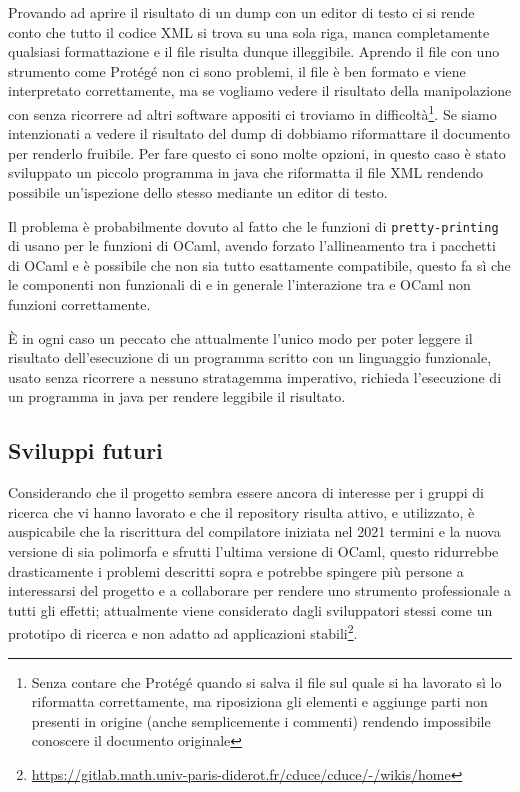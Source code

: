 Provando ad aprire il risultato di un dump con un editor di testo ci si rende conto che tutto il codice XML si trova su una sola riga, manca completamente qualsiasi formattazione e il file risulta dunque illeggibile. Aprendo il file con uno strumento come Protégé non ci sono problemi, il file è ben formato e viene interpretato correttamente, ma se vogliamo vedere il risultato della manipolazione con \cduce senza ricorrere ad altri software appositi ci troviamo in difficoltà\footnote{Senza contare che Protégé quando si salva il file sul quale si ha lavorato sì lo riformatta correttamente, ma riposiziona gli elementi e aggiunge parti non presenti in origine (anche semplicemente i commenti) rendendo impossibile conoscere il documento originale}. Se siamo intenzionati a vedere il risultato del dump di \cduce dobbiamo riformattare il documento per renderlo fruibile. Per fare questo ci sono molte opzioni, in questo caso è stato sviluppato un piccolo programma in java che riformatta il file XML rendendo possibile un'ispezione dello stesso mediante un editor di testo. 

Il problema è probabilmente dovuto al fatto che le funzioni di \verb|pretty-printing| di \cduce usano per le funzioni di OCaml, avendo forzato l'allineamento tra i pacchetti di OCaml e \cduce è possibile che non sia tutto esattamente compatibile, questo fa sì che le componenti non funzionali di \cduce e in generale l'interazione tra \cduce e OCaml non funzioni correttamente.

È in ogni caso un peccato che attualmente l'unico modo per poter leggere il risultato dell'esecuzione di un programma scritto con un linguaggio funzionale, usato senza ricorrere a nessuno stratagemma imperativo, richieda l'esecuzione di un programma in java per rendere leggibile il risultato.
\subsection{Sviluppi futuri}
Considerando che il progetto sembra essere ancora di interesse per i gruppi di ricerca che vi hanno lavorato e che il repository risulta attivo, e utilizzato, è auspicabile che la riscrittura del compilatore iniziata nel 2021 termini e la nuova versione di \cduce sia polimorfa e sfrutti l'ultima versione di OCaml, questo ridurrebbe drasticamente i problemi descritti sopra e potrebbe spingere più persone a interessarsi del progetto e a collaborare per rendere \cduce uno strumento professionale a tutti gli effetti; attualmente \cduce viene considerato dagli sviluppatori stessi come un prototipo di ricerca e non adatto ad applicazioni stabili\footnote{\url{https://gitlab.math.univ-paris-diderot.fr/cduce/cduce/-/wikis/home}}.
